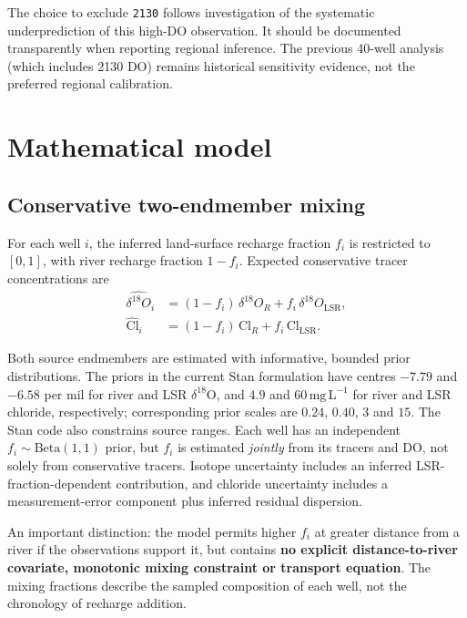 \documentclass[11pt,a4paper]{article}
\newcommand{\LSR}{\mathrm{LSR}}
\newcommand{\site}[1]{\texttt{#1}}
\newcommand{\mgL}{\mathrm{mg\,L^{-1}}}
\begin{document}
The choice to exclude \site{2130} follows investigation of the systematic underprediction of this high-DO observation. It should be documented transparently when reporting regional inference. The previous 40-well analysis (which includes 2130 DO) remains historical sensitivity evidence, not the preferred regional calibration.

\section{Mathematical model}
\subsection{Conservative two-endmember mixing}
For each well \(i\), the inferred land-surface recharge fraction \(f_i\) is restricted to \([0,1]\), with river recharge fraction \(1-f_i\). Expected conservative tracer concentrations are
\begin{align}
 \widehat{\delta^{18}O}_i &=(1-f_i)\,\delta^{18}O_R+f_i\,\delta^{18}O_{\LSR},\\
 \widehat{\mathrm{Cl}}_i &=(1-f_i)\,\mathrm{Cl}_R+f_i\,\mathrm{Cl}_{\LSR}.\label{eq:mix}
\end{align}

Both source endmembers are estimated with informative, bounded prior distributions. The priors in the current Stan formulation have centres \(-7.79\) and \(-6.58\) per mil for river and LSR \(\delta^{18}\mathrm O\), and \(4.9\) and \(60\,\mgL\) for river and LSR chloride, respectively; corresponding prior scales are \(0.24\), \(0.40\), \(3\) and \(15\). The Stan code also constrains source ranges. Each well has an independent \(f_i\sim\mathrm{Beta}(1,1)\) prior, but \(f_i\) is estimated \emph{jointly} from its tracers and DO, not solely from conservative tracers. Isotope uncertainty includes an inferred LSR-fraction-dependent contribution, and chloride uncertainty includes a measurement-error component plus inferred residual dispersion.

An important distinction: the model permits higher \(f_i\) at greater distance from a river if the observations support it, but contains \textbf{no explicit distance-to-river covariate, monotonic mixing constraint or transport equation}. The mixing fractions describe the sampled composition of each well, not the chronology of recharge addition.
\end{document}
